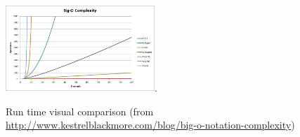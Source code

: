 \begin{figure}[h!]
  \begin{center}
    \includegraphics[width=0.5\textwidth]{figures/big-o-complexity.png}.
    \caption{
      Run time visual comparison (from \url{http://www.kestrelblackmore.com/blog/big-o-notation-complexity})}
    \label{fig:example_figure}
  \end{center}
\end{figure}


\vspace{3mm}

